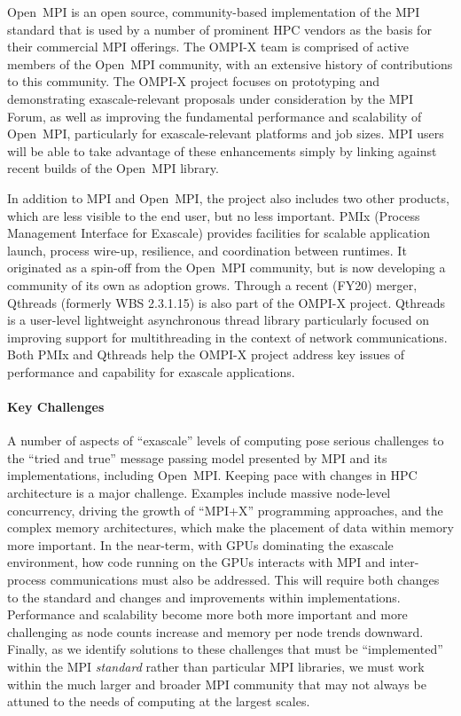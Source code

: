 Open~MPI is an open source, community-based implementation of the MPI
standard that is used by a number of prominent
HPC vendors as the basis for their commercial MPI offerings.   The
OMPI-X team is comprised of active members of the Open~MPI community,
with an extensive history of contributions to this community.
The OMPI-X project focuses on prototyping
and demonstrating exascale-relevant proposals under consideration by
the MPI Forum, as well as improving the fundamental performance and
scalability of Open~MPI, particularly for exascale-relevant platforms
and job sizes.
MPI users will be able to take advantage of these
enhancements simply by linking against recent builds of the Open~MPI
library.

In addition to MPI and Open~MPI, the project also includes two other products,
which are less visible to the end user, but no less important.
PMIx (Process Management Interface for Exascale) provides facilities for
scalable application launch, process wire-up, resilience, and coordination between runtimes.
It originated as a spin-off from the Open~MPI community, but is now developing a
community of its own as adoption grows.  Through a recent (FY20) merger,
Qthreads (formerly WBS 2.3.1.15) is also part of the OMPI-X project.  Qthreads is a
user-level lightweight asynchronous thread library particularly focused on improving support for
multithreading in the context of network communications.  Both PMIx and Qthreads help the
OMPI-X project address key issues of performance and capability for exascale applications.


\paragraph{Key  Challenges}
A number of aspects of ``exascale'' levels
of computing pose serious challenges to the ``tried and true'' message
passing model presented by MPI and its implementations, including Open~MPI.
%
Keeping pace with changes in HPC architecture is a major challenge.
Examples include massive node-level concurrency, driving the
growth of ``MPI+X'' programming approaches,
and the complex memory architectures, which make the placement of data
within memory more important. In the near-term, with GPUs dominating the exascale
environment, how code running on the GPUs interacts with MPI and inter-process
communications must also be addressed.  This will require both changes to the standard
and changes and improvements within implementations.
%
Performance and scalability become more both more important and more
challenging as node counts increase
and memory per node trends downward.
%
Finally, as we identify solutions to these challenges that must be
``implemented'' within the MPI \emph{standard} rather than particular MPI libraries,
we must work within the much larger and broader MPI
community that may not always be attuned to the needs of computing at the largest scales.

